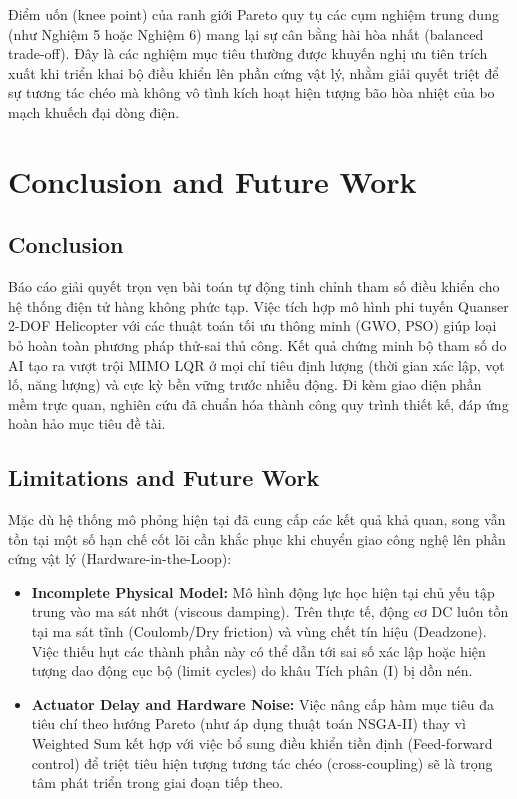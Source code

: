 \documentclass[conference, a4paper]{IEEEtran}
\begin{document}
Điểm uốn (knee point) của ranh giới Pareto quy tụ các cụm nghiệm trung dung (như Nghiệm 5 hoặc Nghiệm 6) mang lại sự cân bằng hài hòa nhất (balanced trade-off). Đây là các nghiệm mục tiêu thường được khuyến nghị ưu tiên trích xuất khi triển khai bộ điều khiển lên phần cứng vật lý, nhằm giải quyết triệt để sự tương tác chéo mà không vô tình kích hoạt hiện tượng bão hòa nhiệt của bo mạch khuếch đại dòng điện.
\section{Conclusion and Future Work}
\subsection{Conclusion}
Báo cáo giải quyết trọn vẹn bài toán tự động tinh chỉnh tham số điều khiển cho hệ thống điện tử hàng không phức tạp. Việc tích hợp mô hình phi tuyến Quanser 2-DOF Helicopter với các thuật toán tối ưu thông minh (GWO, PSO) giúp loại bỏ hoàn toàn phương pháp thử-sai thủ công. Kết quả chứng minh bộ tham số do AI tạo ra vượt trội MIMO LQR ở mọi chỉ tiêu định lượng (thời gian xác lập, vọt lố, năng lượng) và cực kỳ bền vững trước nhiễu động. Đi kèm giao diện phần mềm trực quan, nghiên cứu đã chuẩn hóa thành công quy trình thiết kế, đáp ứng hoàn hảo mục tiêu đề tài.
\subsection{Limitations and Future Work}
Mặc dù hệ thống mô phỏng hiện tại đã cung cấp các kết quả khả quan, song vẫn tồn tại một số hạn chế cốt lõi cần khắc phục khi chuyển giao công nghệ lên phần cứng vật lý (Hardware-in-the-Loop):
\begin{itemize}
    \item \textbf{Incomplete Physical Model:} Mô hình động lực học hiện tại chủ yếu tập trung vào ma sát nhớt (viscous damping). Trên thực tế, động cơ DC luôn tồn tại ma sát tĩnh (Coulomb/Dry friction) và vùng chết tín hiệu (Deadzone). Việc thiếu hụt các thành phần này có thể dẫn tới sai số xác lập hoặc hiện tượng dao động cục bộ (limit cycles) do khâu Tích phân (I) bị dồn nén.
    \item \textbf{Actuator Delay and Hardware Noise:} Việc nâng cấp hàm mục tiêu đa tiêu chí theo hướng Pareto (như áp dụng thuật toán NSGA-II) thay vì Weighted Sum kết hợp với việc bổ sung điều khiển tiền định (Feed-forward control) để triệt tiêu hiện tượng tương tác chéo (cross-coupling) sẽ là trọng tâm phát triển trong giai đoạn tiếp theo.
\end{itemize}
\end{document}
